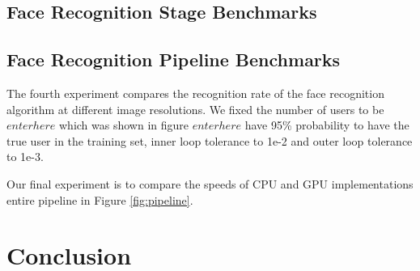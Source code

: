 \documentclass[10pt,twocolumn,letterpaper]{article}
\begin{document}
\subsection{Face Recognition Stage Benchmarks}
\label{sec:recognition_benchmark}

\subsection{Face Recognition Pipeline Benchmarks}
\label{sec:pipeline_benchmark}
The fourth experiment compares the recognition rate of the face recognition algorithm at different
image resolutions.  We fixed the number of users to be $enter here$ which was shown in figure  $enter here$  have 95\% probability
to have the true user in the training set, inner loop tolerance to 1e-2 and outer loop tolerance to 1e-3.  

Our final experiment is to compare the speeds of CPU and GPU implementations entire pipeline in Figure \ref{fig:pipeline}.

\section{Conclusion}

{\small


}
\end{document}
